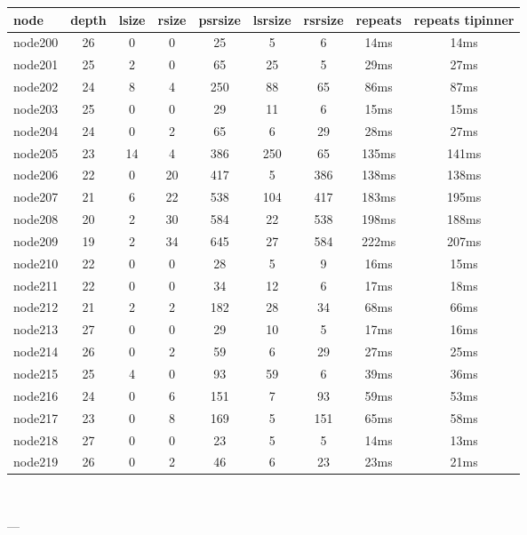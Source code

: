 \begin{tabular}{|l|c|c|c|c|c|c|c|c|}
\hline node & depth & lsize & rsize & psrsize & lsrsize & rsrsize   & repeats & repeats tipinner\\
    \hline node200 & 26 & 0 & 0 & 25 & 5 & 6 & 14ms & 14ms\\
    \hline node201 & 25 & 2 & 0 & 65 & 25 & 5 & 29ms & 27ms\\
    \hline node202 & 24 & 8 & 4 & 250 & 88 & 65 & 86ms & 87ms\\
    \hline node203 & 25 & 0 & 0 & 29 & 11 & 6 & 15ms & 15ms\\
    \hline node204 & 24 & 0 & 2 & 65 & 6 & 29 & 28ms & 27ms\\
    \hline node205 & 23 & 14 & 4 & 386 & 250 & 65 & 135ms & 141ms\\
    \hline node206 & 22 & 0 & 20 & 417 & 5 & 386 & 138ms & 138ms\\
    \hline node207 & 21 & 6 & 22 & 538 & 104 & 417 & 183ms & 195ms\\
    \hline node208 & 20 & 2 & 30 & 584 & 22 & 538 & 198ms & 188ms\\
    \hline node209 & 19 & 2 & 34 & 645 & 27 & 584 & 222ms & 207ms\\
    \hline node210 & 22 & 0 & 0 & 28 & 5 & 9 & 16ms & 15ms\\
    \hline node211 & 22 & 0 & 0 & 34 & 12 & 6 & 17ms & 18ms\\
    \hline node212 & 21 & 2 & 2 & 182 & 28 & 34 & 68ms & 66ms\\
    \hline node213 & 27 & 0 & 0 & 29 & 10 & 5 & 17ms & 16ms\\
    \hline node214 & 26 & 0 & 2 & 59 & 6 & 29 & 27ms & 25ms\\
    \hline node215 & 25 & 4 & 0 & 93 & 59 & 6 & 39ms & 36ms\\
    \hline node216 & 24 & 0 & 6 & 151 & 7 & 93 & 59ms & 53ms\\
    \hline node217 & 23 & 0 & 8 & 169 & 5 & 151 & 65ms & 58ms\\
    \hline node218 & 27 & 0 & 0 & 23 & 5 & 5 & 14ms & 13ms\\
    \hline node219 & 26 & 0 & 2 & 46 & 6 & 23 & 23ms & 21ms\\

\hline
\end{tabular} \

---



